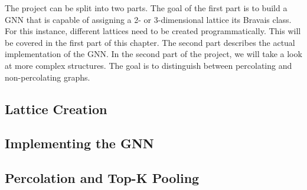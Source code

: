 \label{sec:goalsImpl}

The project can be split into two parts. The goal of the first part is to build a GNN that is capable of assigning a 2- or 3-dimensional lattice its Bravais class. 
For this instance, different lattices need to be created programmatically. This will be covered in the first part of this chapter. The second part describes the actual implementation of the GNN.
In the second part of the project, we will take a look at more complex structures. The goal is to distinguish between percolating and non-percolating graphs.

\subsection{Lattice Creation}


\subsection{Implementing the GNN}


\subsection{Percolation and Top-K Pooling}

